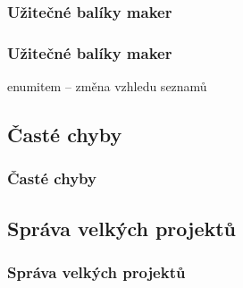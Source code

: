 \subsubsection{Užitečné balíky maker}
\begin{frame}
	\frametitle{Užitečné balíky maker}
	enumitem -- změna vzhledu seznamů
\end{frame}


\subsection{Časté chyby}
\begin{frame}
	\frametitle{Časté chyby}
\end{frame}


\subsection{Správa velkých projektů}
\begin{frame}
	\frametitle{Správa velkých projektů}
\end{frame}

\endinput